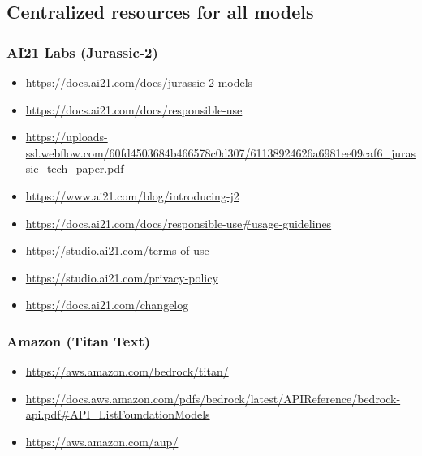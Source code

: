 \subsection{Centralized resources for all models}

\subsubsection{AI21 Labs (Jurassic-2)}
\begin{itemize}
\item \url{https://docs.ai21.com/docs/jurassic-2-models}
\item \url{https://docs.ai21.com/docs/responsible-use}
\item \url{https://uploads-ssl.webflow.com/60fd4503684b466578c0d307/61138924626a6981ee09caf6_jurassic_tech_paper.pdf}
\item \url{https://www.ai21.com/blog/introducing-j2}
\item \url{https://docs.ai21.com/docs/responsible-use#usage-guidelines}
\item \url{https://studio.ai21.com/terms-of-use}
\item \url{https://studio.ai21.com/privacy-policy}
\item \url{https://docs.ai21.com/changelog}
\end{itemize}

\subsubsection{Amazon (Titan Text)}
\begin{itemize}
\item \url{https://aws.amazon.com/bedrock/titan/}
\item \url{https://docs.aws.amazon.com/pdfs/bedrock/latest/APIReference/bedrock-api.pdf#API_ListFoundationModels}
\item \url{https://aws.amazon.com/aup/}
\end{itemize}

